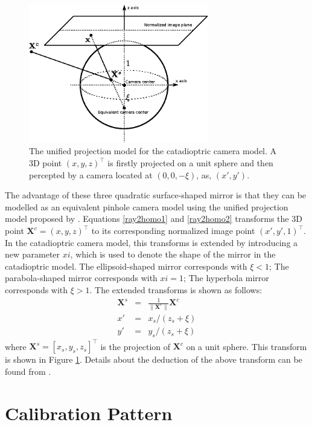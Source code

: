 \documentclass{report}
\begin{document}
\begin{figure}
\centering
\includegraphics[width = 0.7\textwidth]{images/liftSphere.eps}
\caption{The unified projection model for the catadioptric camera model. A 3D point $(x, y, z)^\top$ is firstly projected on a unit sphere and then percepted by a camera located at $(0, 0, -\xi)$, as, $(x', y')$. }
\end{figure}


The advantage of these three quadratic surface-shaped mirror is that they can be modelled as an equivalent pinhole camera model using the unified projection model proposed by \cite{}. Equations \ref{ray2homo1} and \ref{ray2homo2} transforms the 3D point $\mathbf{X}^c = (x, y, z)^\top$ to its corresponding normalized image point $(x', y', 1)^\top$. In the catadioptric camera model, this transforms is extended by introducing a new parameter $xi$, which is used to denote the shape of the mirror in the catadioptric model. The ellipsoid-shaped mirror corresponds with $\xi < 1$; The parabola-shaped mirror corresponds with $xi = 1$; The hyperbola mirror corresponds with $\xi > 1$. The extended transforms is shown as follows: 
\begin{eqnarray}
\mathbf{X}^s &=&
\frac{1}{\| \mathbf{X}^c \|} \mathbf{X}^c \\
x' &=& x_s / (z_s + \xi) \label{liftEqn1}\\
y' &=& y_s / (z_s + \xi) \label{liftEqn2}
\end{eqnarray}
where $\mathbf{X}^s = [x_s, y_s, z_s]^\top$ is the projection of $\mathbf{X}^c$ on a unit sphere. This transform is shown in Figure \ref{}. Details about the deduction of the above transform can be found from \cite{}. 

 

\chapter{Calibration Pattern}
\end{document}
